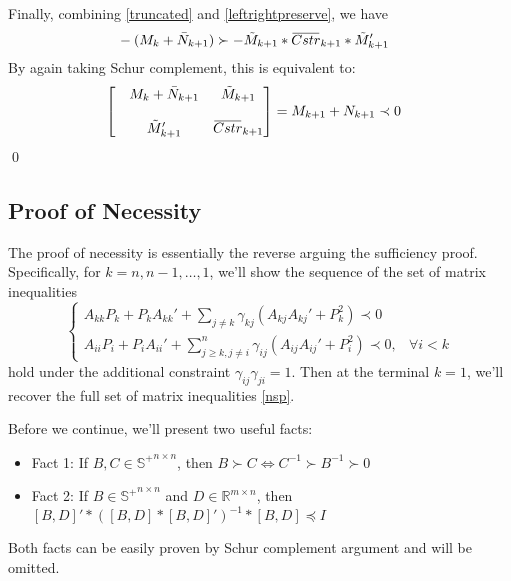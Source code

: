 \documentclass{article}
\newcommand{\overbar}[1]{\mkern 1.5mu\overline{\mkern-1.5mu#1\mkern-1.5mu}\mkern 1.5mu}
\begin{document}
Finally, combining \eqref{truncated} and \eqref{leftrightpreserve}, we have
\begin{equation}\label{finalexpanded}
\begin{aligned}
&-(M_k+\bar{N}_{k+1})\succ - \tilde M_{k+1}*\overbar{Cstr}_{k+1}*\tilde M_{k+1}'
\end{aligned}
\end{equation}
By again taking Schur complement, this is equivalent to:
\begin{equation}\label{final}
\begin{aligned}
&\begin{bmatrix}
&M_k+\bar{N}_{k+1}  &\tilde M_{k+1} \\
\\
&\tilde M_{k+1}'&\overbar{Cstr}_{k+1}\\
\end{bmatrix}=M_{k+1}+N_{k+1}\prec 0
\end{aligned}
\end{equation}\qed




\subsection{Proof of Necessity} %
\label{sub:proof_of_necessity}
The proof of necessity is essentially the reverse arguing the sufficiency proof. Specifically, for $k=n,n-1,\dots, 1$, we'll show the sequence of the set of matrix inequalities 
\begin{equation}
\begin{cases}A_{kk}P_{k}+P_{k}A_{kk}'+\sum\limits_{j\neq k}\gamma_{kj}(A_{kj}A_{kj}'+P_{k}^2)\prec 0&\\
  A_{ii}P_{i}+P_{i}A_{ii}'+\sum\limits_{j\geq k, j\neq i}^{n}\gamma_{ij}(A_{ij}A_{ij}'+P_{i}^2)\prec 0, & {\forall i<k}
  \end{cases}
\end{equation} hold under the additional constraint $\gamma_{ij}\gamma_{ji}=1$. Then at the terminal $k=1$, we'll recover the full set of matrix inequalities \eqref{nsp}.


Before we continue, we'll present two useful facts:
\begin{itemize}
 \item Fact 1: If $B,C\in \mathbb{S^{+}}^{n\times n}$, then $B\succ C \iff C^{-1}\succ B^{-1}\succ 0$
\item Fact 2: If $B\in  \mathbb{S^{+}}^{n\times n}$ and $D \in \mathbb{R}^{m\times n}$, then $[B,D]'*([B,D]*[B,D]')^{-1}*[B,D]\preceq I$
\end{itemize}Both facts can be easily proven by Schur complement argument and will be omitted.
\end{document}
